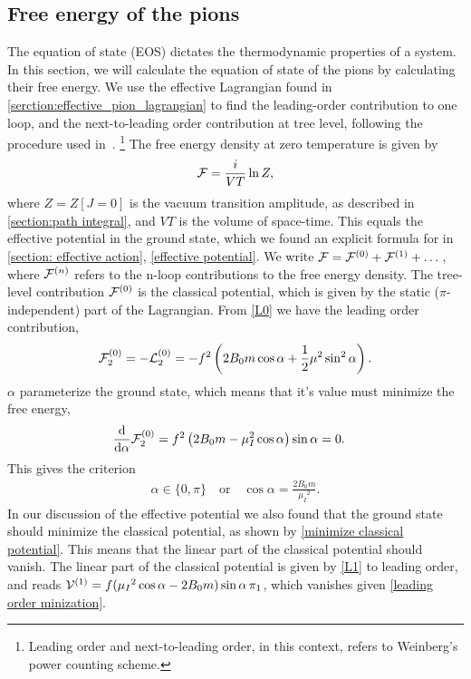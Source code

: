 \subsection{Free energy of the pions}
The equation of state (EOS) dictates the thermodynamic properties of a system.
In this section, we will calculate the equation of state of the pions by calculating their free energy.
We use the effective Lagrangian found in \autoref{serction:effective_pion_lagrangian} to find the leading-order contribution to one loop, and the next-to-leading order contribution at tree level, following the procedure used in~\cite{mojahed, Andersen:two-flavor-chpt}.
\footnote{Leading order and next-to-leading order, in this context, refers to Weinberg's power counting scheme.}
The free energy density at zero temperature is given by
\begin{equation}
    \mathcal{F} = \frac{i}{VT} \ln Z,
\end{equation}
where $Z = Z[J=0]$ is the vacuum transition amplitude, as described in \autoref{section:path integral}, and $VT$ is the volume of space-time.
This equals the effective potential in the ground state, which we found an explicit formula for in \autoref{section: effective action}, \cref{effective potential}.
We write $\mathcal{F} = \mathcal{F}^{(0)} + \mathcal{F}^{(1)} + \dots$, where $\mathcal{F}^{(n)}$ refers to the n-loop contributions to the free energy density.
The tree-level contribution $\mathcal{F}^{(0)}$ is the classical potential, which is given by the static ($\pi$-independent) part of the Lagrangian.
From \cref{L0} we have the leading order contribution,
\begin{equation}
    \mathcal{F}_2^{(0)}
    = - \mathcal{L}_2^{(0)} 
    = 
    -f^2   
    \left(
        2B_0m \cos{\alpha}
        + \frac{1}{2} \mu^2 \sin^2{\alpha}
    \right).
\end{equation}
$\alpha$ parameterize the ground state, which means that it's value must minimize the free energy,
\begin{align*}
    &\dv{\alpha} \mathcal{F}_2^{(0)} 
    = f^2\left(2B_0m - \mu_I^2\cos{\alpha}\right)\sin{\alpha}
    = 0.
\end{align*}
This gives the criterion
\begin{align}
    \label{leading order minization}
    \alpha \in \{0, \pi\} \quad
    \mathrm{or} \quad
    \cos{\alpha} = \frac{2B_0m}{\mu_I{}^2}.
\end{align}
In our discussion of the effective potential we also found that the ground state should minimize the classical potential, as shown by \cref{minimize classical potential}.
This means that the linear part of the classical potential should vanish.
The linear part of the classical potential is given by \autoref{L1} to leading order, and reads $\mathcal{V}^{(1)} = f(\mu_I{}^2\cos{\alpha} - 2B_0m)\sin{\alpha} \, \pi_1 $, which vanishes given \cref{leading order minization}.


